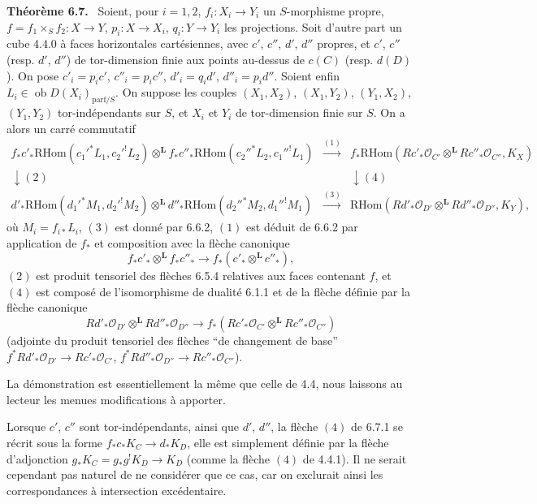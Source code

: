 \documentclass[11pt]{article}
\newenvironment{statement}[1]{\par\medskip\noindent\textbf{#1.}\ }{\par\medskip}
\newcommand{\ob}{\operatorname{ob}}
\providecommand{\RHom}{\mathrm{RHom}}
\providecommand{\parf}{\mathrm{parf}}
\providecommand{\LL}{\mathbf L}
\providecommand{\OO}{\mathcal O}
\begin{document}
\begin{statement}{Théorème 6.7}
Soient, pour $i=1,2$, $f_i:X_i\to Y_i$ un $S$-morphisme propre, $f=f_1\times_S f_2:X\to Y$, $p_i:X\to X_i$, $q_i:Y\to Y_i$ les projections. Soit d'autre part un cube 4.4.0 à faces horizontales cartésiennes, avec $c'$, $c''$, $d'$, $d''$ propres, et $c'$, $c''$ (resp. $d'$, $d''$) de tor-dimension finie aux points au-dessus de $c(C)$ (resp. $d(D)$). On pose $c'_i=p_ic'$, $c''_i=p_ic''$, $d'_i=q_id'$, $d''_i=p_id''$. Soient enfin $L_i\in\ob D(X_i)_{\parf/S}$. On suppose les couples $(X_1,X_2)$, $(X_1,Y_2)$, $(Y_1,X_2)$, $(Y_1,Y_2)$ tor-indépendants sur $S$, et $X_i$ et $Y_i$ de tor-dimension finie sur $S$. On a alors un carré commutatif
\begin{equation}
\tag{6.7.1}
\begin{array}{ccc}
f_*c'_*\RHom(c_1'^*L_1,c_2'^!L_2)\otimes^{\LL} f_*c''_*\RHom(c_2''^*L_2,c_1''^!L_1)
&\xrightarrow{(1)}&
f_*\RHom(Rc'_*\OO_{C'}\otimes^{\LL}Rc''_*\OO_{C''},K_X)\\[0.8em]
\downarrow{(2)}&&\downarrow{(4)}\\[0.8em]
d'_*\RHom(d_1'^*M_1,d_2'^!M_2)\otimes^{\LL} d''_*\RHom(d_2''^*M_2,d_1''^!M_1)
&\xrightarrow{(3)}&
\RHom(Rd'_*\OO_{D'}\otimes^{\LL}Rd''_*\OO_{D''},K_Y),
\end{array}
\end{equation}
où $M_i=f_{i*}L_i$, $(3)$ est donné par 6.6.2, $(1)$ est déduit de 6.6.2 par application de $f_*$ et composition avec la flèche canonique
\[
f_*c'_*\otimes^{\LL}f_*c''_*\longrightarrow f_*(c'_*\otimes^{\LL}c''_*),
\]
$(2)$ est produit tensoriel des flèches 6.5.4 relatives aux faces contenant $f$, et $(4)$ est composé de l'isomorphisme de dualité 6.1.1 et de la flèche définie par la flèche canonique
\[
Rd'_*\OO_{D'}\otimes^{\LL}Rd''_*\OO_{D''}
\longrightarrow
f_*(Rc'_*\OO_{C'}\otimes^{\LL}Rc''_*\OO_{C''})
\]
(adjointe du produit tensoriel des flèches ``de changement de base'' $f^*Rd'_*\OO_{D'}\to Rc'_*\OO_{C'}$, $f^*Rd''_*\OO_{D''}\to Rc''_*\OO_{C''}$).

La démonstration est essentiellement la même que celle de 4.4, nous laissons au lecteur les menues modifications à apporter.

Lorsque $c'$, $c''$ sont tor-indépendants, ainsi que $d'$, $d''$, la flèche $(4)$ de 6.7.1 se récrit sous la forme $f_*c_*K_C\to d_*K_D$, elle est simplement définie par la flèche d'adjonction $g_*K_C=g_*g^!K_D\to K_D$ (comme la flèche $(4)$ de 4.4.1). Il ne serait cependant pas naturel de ne considérer que ce cas, car on exclurait ainsi les correspondances à intersection excédentaire.


\end{statement}
\end{document}
